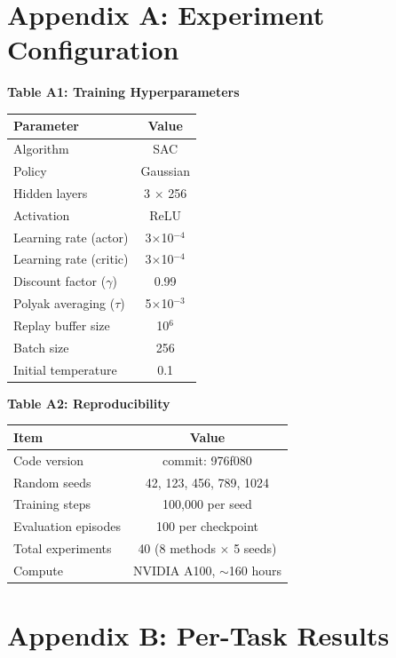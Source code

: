 \documentclass[11pt, a4paper, oneside]{article}
\theoremstyle{plain}
\theoremstyle{break}
\theoremstyle{plain}
\theoremstyle{breakdef}
\theoremstyle{plain}
\theoremstyle{breakrem}
\theoremstyle{plain}
\theoremstyle{breakrem}
\begin{document}
\section*{Appendix A: Experiment Configuration}

\textbf{Table A1: Training Hyperparameters}
\begin{table}[htbp]
\centering
\begin{tabular}{lc}
\toprule
Parameter & Value \\
\midrule
Algorithm & SAC \\
Policy & Gaussian \\
Hidden layers & 3 $\times$ 256 \\
Activation & ReLU \\
Learning rate (actor) & 3$\times$10$^{-4}$ \\
Learning rate (critic) & 3$\times$10$^{-4}$ \\
Discount factor ($\gamma$) & 0.99 \\
Polyak averaging ($\tau$) & 5$\times$10$^{-3}$ \\
Replay buffer size & 10$^6$ \\
Batch size & 256 \\
Initial temperature & 0.1 \\
\bottomrule
\end{tabular}
\end{table}

\textbf{Table A2: Reproducibility}
\begin{table}[htbp]
\centering
\begin{tabular}{lc}
\toprule
Item & Value \\
\midrule
Code version & commit: 976f080 \\
Random seeds & 42, 123, 456, 789, 1024 \\
Training steps & 100,000 per seed \\
Evaluation episodes & 100 per checkpoint \\
Total experiments & 40 (8 methods $\times$ 5 seeds) \\
Compute & NVIDIA A100, $\sim$160 hours \\
\bottomrule
\end{tabular}
\end{table}

\section*{Appendix B: Per-Task Results}
\end{document}
